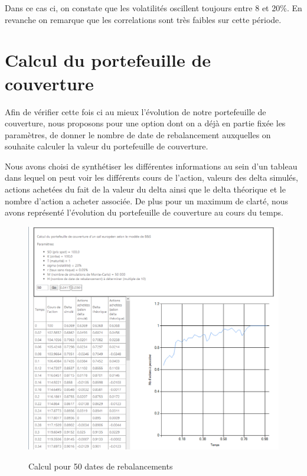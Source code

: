 \documentclass[french,12pt,a4paper]{article}
\begin{document}
Dans ce cas ci, on constate que les volatilités oscillent toujours entre 8 et 20\%. En revanche on remarque que les correlations sont très faibles sur cette période.
\newpage
\section{Calcul du portefeuille de couverture}

\indent Afin de vérifier cette fois ci au mieux l'évolution de notre portefeuille de couverture, nous proposons pour une option dont on a déjà en partie fixée les paramètres, de donner le nombre de date de rebalancement auxquelles on souhaite calculer la valeur du portefeuille de couverture.

\indent Nous avons choisi de synthétiser les différentes informations au sein d'un tableau dans lequel on peut voir les différents cours de l'action, valeurs des delta simulés, actions achetées du fait de la valeur du delta ainsi que le delta théorique et le nombre d'action a acheter associée. De plus pour un maximum de clarté, nous avons représenté l'évolution du portefeuille de couverture au cours du temps. 

\begin{center}
\begin{figure}[h!]
    \caption{Calcul pour 50 dates de rebalancements}
    \includegraphics[scale=0.57]{../test5.png}
    \label{fig:PropProf}
\end{figure}
\end{center} 
\end{document}
